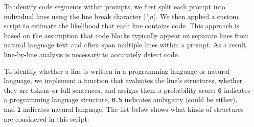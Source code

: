 To identify code segments within prompts, we first split each prompt into individual lines using the line break character (\textit{\textbackslash n}). We then applied a custom script to estimate the likelihood that each line contains code. This approach is based on the assumption that code blocks typically appear on separate lines from natural language text and often span multiple lines within a prompt. As a result, line-by-line analysis is necessary to accurately detect code.

To identify whether a line is written in a programming language or natural language, we implement a function that evaluates the line’s structures, whether they are tokens or full sentences, and assigns them a probability score: \texttt{0} indicates a programming language structure, \texttt{0.5} indicates ambiguity (could be either), and \texttt{1} indicates natural language. The list below shows what kinds of structures are considered in this script:
